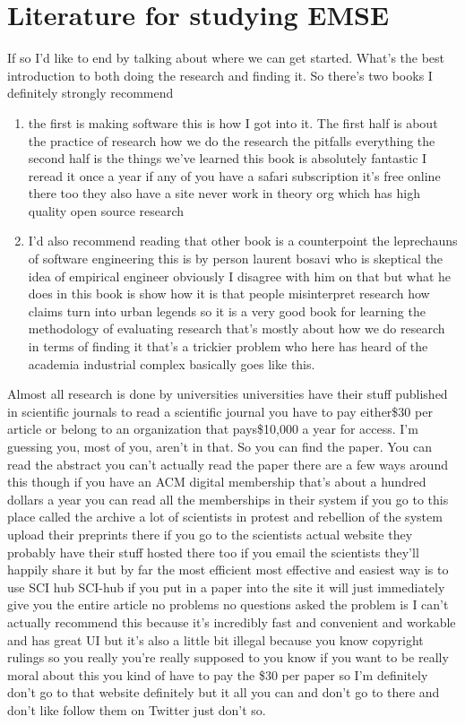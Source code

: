 \documentclass[14pt]{extreport}
\begin{document}
\chapter{Literature for studying EMSE}
If so I'd like to end by talking about where we can get started.
What's the best introduction to both doing the research and finding it.
So there's two books I definitely strongly recommend
\begin{enumerate}
	\item the first is making software this is how I got into it. 
	The first half is about the practice of research how we do the
research the pitfalls everything the
second half is the things we've learned
this book is absolutely fantastic I
reread it once a year if any of you have
a safari subscription it's free online
there too they also have a site never
work in theory org which has high
quality open source research
\item I'd also recommend reading that other book is a
counterpoint the leprechauns of software
engineering this is by person laurent
bosavi who is skeptical the idea of
empirical engineer
obviously I disagree with him on that
but what he does in this book is show
how it is that people misinterpret
research how claims turn into urban
legends so it is a very good book for
learning the methodology of evaluating
research that's mostly about how we do
research in terms of finding it
that's a trickier problem who here has heard of the academia industrial complex
basically goes like this.
\end{enumerate}
Almost all research is done by universities universities have their
stuff published in scientific journals
to read a scientific journal you have to
pay either\$30 per article or belong to
an organization that pays\$10,000 a year for access.
I'm guessing you, most of you, aren't in that. 
So you can find the paper. You can read the abstract you can't
actually read the paper there are a few
ways around this though if you have an
ACM digital membership that's about a
hundred dollars a year you can read all
the memberships in their system if you
go to this place called the archive a
lot of scientists in protest and
rebellion of the system upload their
preprints there if you go to the
scientists actual website they probably
have their stuff hosted there too if you
email the scientists they'll happily
share it but by far the most efficient
most effective and easiest way is to use
SCI hub SCI-hub if you put in a
paper into the site it will just
immediately give you the entire article
no problems no questions asked the
problem is I can't actually recommend
this because it's incredibly fast and
convenient and workable and has great UI
but it's also a little bit illegal
because you know copyright rulings so
you really you're really supposed to you
know if you want to be really moral
about this you kind of have to pay the
\$30 per paper so I'm definitely don't go
to that website definitely but it all
you can and don't go to there and don't like follow them on Twitter just don't so.
\end{document}
